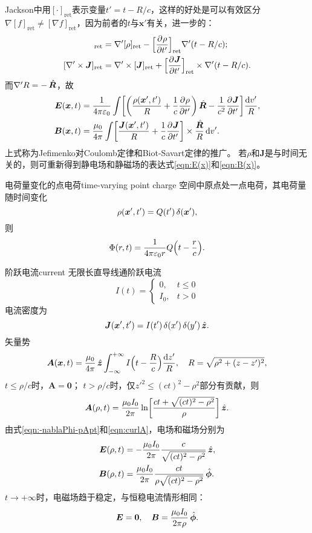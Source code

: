 Jackson中用$[\cdot]_\text{ret}$表示变量$t'=t-R/c$，这样的好处是可以有效区分$\nabla[f]_\text{ret}\neq[\nabla f]_\text{ret}$，因为前者的$t$与$\bm x'$有关，进一步的：
\begin{align*}
    [\nabla'\rho]_\text{ret}&=\nabla'[\rho]_\text{ret}-\Bigfkh{\pv\rho{t'}}_\text{ret}\nabla'(t-R/c);\\
    [\nabla'\times\bm J]_\text{ret}&=\nabla'\times[\bm J]_\text{ret}+\Bigfkh{\pv{\bm J}{t'}}_\text{ret}\times\nabla'(t-R/c).
\end{align*}
而$\nabla'R=-\mathop{}\!\hat{\bm{R}}$，故
\begin{subequations}
    \begin{align}
        \bm E(\bm x,t)&=\frac1{4\pi\varepsilon_0}\int\biggl[\biggl(\frac{\rho(\bm x',t')}R+\frac1c\frac{\partial^{{}}\rho}{\partial{t'}^{{}}}\biggr)\mathop{}\!\hat{\bm{R}}-\frac1{c^2}\frac{\partial^{{}}\bm J}{\partial{t'}^{{}}}\biggr]\frac{\mathop{}\!\mathrm{d} v'}R,\\
        \bm B(\bm x,t)&=\frac{\mu_0}{4\pi}\int\biggl[\frac{\bm J(\bm x',t')}R+\frac1c\frac{\partial^{{}}\bm J}{\partial{t'}^{{}}}\biggr]\times\frac{\hat{\bm{R}}}R\mathop{}\!\mathrm{d} v'.
    \end{align}
\end{subequations}
上式称为Jefimenko对Coulomb定律和Biot-Savart定律的推广。
若$\rho$和$\bm J$是与时间无关的，则可重新得到静电场和静磁场的表达式\eqref{eqn:E(x)}和\eqref{eqn:B(x)}。
\begin{example}{电荷量变化的点电荷}{time-varying point charge}
    空间中原点处一点电荷，其电荷量随时间变化
    \[
        \rho(\bm x',t')=Q(t')\mathop{}\!\delta(\bm x'),
    \]
    则
    \[
        \Phi(r,t)=\frac1{4\pi\varepsilon_0r}Q\Bigl(t-\frac rc\Bigr).
    \]
\end{example}
\begin{example}{阶跃电流}{current}
    无限长直导线通阶跃电流
    \[
        I(t)=\begin{cases}
            0,&t\leqslant 0\\
            I_0,&t>0
        \end{cases}
    \]
    电流密度为
    \[
        \bm J(\bm x',t')=I(t')\mathop{}\!\delta(x')\mathop{}\!\delta(y')\mathop{}\!\hat{\bm{z}}.
    \]
    矢量势
    \[
        \bm A(\bm x,t)=\frac{\mu_0}{4\pi}\mathop{}\!\hat{\bm{z}}\int_{-\infty}^{+\infty} I\Bigl(t-\frac Rc\Bigr)\frac{\mathop{}\!\mathrm{d} z'}R,\quad R=\sqrt{\rho^2+(z-z')^2},
    \]
    $t\leqslant\rho/c$时，$\bm A=\bm 0$；
    $t>\rho/c$时，仅$z'^2\leqslant(ct)^2-\rho^2$部分有贡献，则
    \[
        \bm A(\rho,t)=\frac{\mu_0I_0}{2\pi}\ln\biggl[\frac{ct+\sqrt{(ct)^2-\rho^2}}{\rho}\biggr]\mathop{}\!\hat{\bm{z}}.
    \]
    由式\eqref{eqn:-nablaPhi-pApt}和\eqref{eqn:curlA}，电场和磁场分别为
    \begin{align*}
        \bm E(\rho,t)&=-\frac{\mu_0I_0}{2\pi}\frac c{\sqrt{(ct)^2-\rho^2}}\mathop{}\!\hat{\bm{z}},\\
        \bm B(\rho,t)&=\frac{\mu_0I_0}{2\pi}\frac{ct}{\rho\sqrt{(ct)^2-\rho^2}}\mathop{}\!\hat{\bm{\phi}}.
    \end{align*}
    $t\to+\infty$时，电磁场趋于稳定，与恒稳电流情形相同：
    \[
        \bm E=\bm 0,\quad\bm B=\frac{\mu_0I_0}{2\pi\rho}\mathop{}\!\hat{\bm{\phi}}.
    \]
\end{example}
